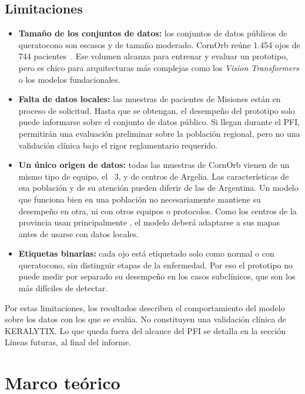     \subsection*{Limitaciones}

        \begin{itemize}
            \item \textbf{Tamaño de los conjuntos de datos:} los conjuntos de datos públicos de queratocono son escasos y de tamaño moderado. CornOrb reúne 1.454 ojos de 744 pacientes~\cite{zenodo}. Ese volumen alcanza para entrenar y evaluar un prototipo, pero es chico para arquitecturas más complejas como los \textit{Vision Transformers} o los modelos fundacionales.

            \item \textbf{Falta de datos locales:} las muestras de pacientes de Misiones están en proceso de solicitud. Hasta que se obtengan, el desempeño del prototipo solo puede informarse sobre el conjunto de datos público. Si llegan durante el PFI, permitirán una evaluación preliminar sobre la población regional, pero no una validación clínica bajo el rigor reglamentario requerido.

            \item \textbf{Un único origen de datos:} todas las muestras de CornOrb vienen de un mismo tipo de equipo, el \Orbscan{}~3, y de centros de Argelia. Las características de esa población y de su atención pueden diferir de las de Argentina. Un modelo que funciona bien en una población no necesariamente mantiene su desempeño en otra, ni con otros equipos o protocolos. Como los centros de la provincia usan principalmente \Pentacam{}, el modelo deberá adaptarse a sus mapas antes de usarse con datos locales.

            \item \textbf{Etiquetas binarias:} cada ojo está etiquetado solo como normal o con queratocono, sin distinguir etapas de la enfermedad. Por eso el prototipo no puede medir por separado su desempeño en los casos subclínicos, que son los más difíciles de detectar.
        \end{itemize}

        Por estas limitaciones, los resultados describen el comportamiento del modelo sobre los datos con los que se evalúa. No constituyen una validación clínica de KERALYTIX. Lo que queda fuera del alcance del PFI se detalla en la sección Líneas futuras, al final del informe.

\section{Marco teórico}

